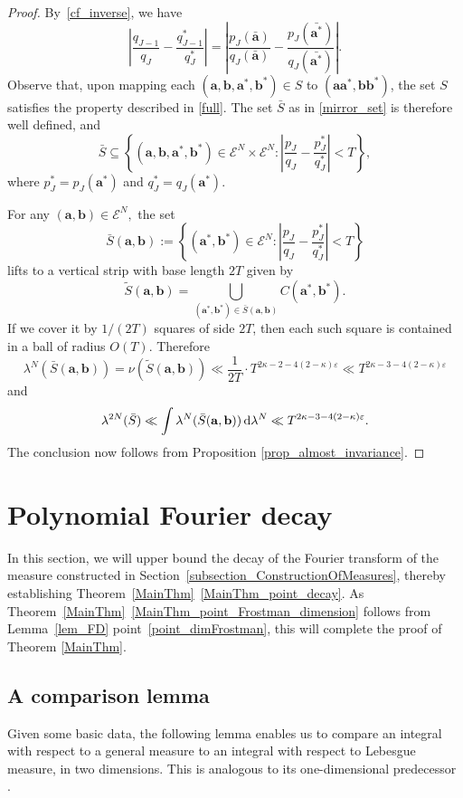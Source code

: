 \documentclass[12pt, reqno]{amsart}
\theoremstyle{definition}
\theoremstyle{remark}
\numberwithin{equation}{section}
\def\kap{{\kappa}}
\def\lam{{\lambda}} \def\Lam{{\Lambda}} \def\Lamtil{{\widetilde \Lambda}}
\def\d{{\,{\rm d}}}
\def \ba {\mathbf a}
\def \bb {\mathbf b}
\def \cE {\mathcal E}
\begin{document}
\begin{proof}
By~\eqref{cf_inverse}, we have
\[  
\left|\frac{q_{J-1}}{q_J}-\frac{q_{J-1}^*}{q_J^*}\right|
= \left|\frac{p_J(\bar{\ba})}{q_J(\bar{\ba})}-\frac{p_J(\bar{\ba^*})}{q_J(\bar{\ba^*})}\right|.
\]
Observe that, upon mapping each $(\ba, \bb, \ba^*, \bb^*) \in S$ to $(\ba \ba^*, \bb \bb^*)$, the set $S$ satisfies the property described in \eqref{full}. The set $\bar{S}$ as in \eqref{mirror_set} is therefore well defined, and
\[
\bar{S} \subseteq \left\{ (\ba,\bb,\ba^*,\bb^*) \in \cE^N\times \cE^N :  \left|\frac{p_J}{q_J}-\frac{p_J^*}{q_J^*}\right| < T \right\},
\]
where $p_J^* = p_J(\ba^*)$ and $q_J^* = q_J(\ba^*)$.

For any $(\ba,\bb)\in \cE^N,$ the set 
\[ 
\bar{S}(\ba,\bb) := \left\{ (\ba^*, \bb^*) \in \cE^{N} : \left| \frac{p_J}{q_J} - \frac{p_J^*}{q_J^*}  \right| < T  \right\} 
\]
lifts to a vertical strip with base length $2T$ given by
\[
\tilde S(\ba, \bb)
= \bigcup_{(\ba^*,\bb^*) \in \bar{S}(\ba,\bb)} 
C(\ba^*, \bb^*).
\]
If we cover it by $1/(2T)$ squares of side $2T$, then each such square is contained in a ball of radius $O(T)$. Therefore
\[  
\lam^N
(\bar{S}(\ba,\bb))
= \nu(\tilde{S}(\ba,\bb))
\ll \frac{1}{2T}\cdot T^{2\kappa - 2 -4(2-\kap)\varepsilon} \ll
T^{2\kappa - 3 - 4(2-\kap)\varepsilon 
} 
\]
and  
\[ 
\lam^{2N}(\bar{S}) \ll \int \lam^N(\bar{S}(\ba, \bb))\d \lam^N \ll T^{2\kappa - 3 - 4(2-\kap)\varepsilon}. 
\]  
The conclusion now follows from Proposition \ref{prop_almost_invariance}.
\end{proof}

\section{Polynomial Fourier decay} \label{section_FD}

In this section, we will upper bound the decay of the Fourier transform of the measure constructed in Section~\ref{subsection_ConstructionOfMeasures}, thereby establishing
Theorem~\ref{MainThm}~\eqref{MainThm_point_decay}. As Theorem~\ref{MainThm}~\eqref{MainThm_point_Frostman_dimension} follows from Lemma~\ref{lem_FD} point~\eqref{point_dimFrostman}, this will complete the proof of Theorem \ref{MainThm}.

\subsection{A comparison lemma} Given some basic data, the following lemma enables us to compare an integral with respect to a general measure to an integral with respect to Lebesgue measure, in two dimensions. This is analogous to its one-dimensional predecessor \cite[Lemma 5.3]{QR2003}.
\end{document}
